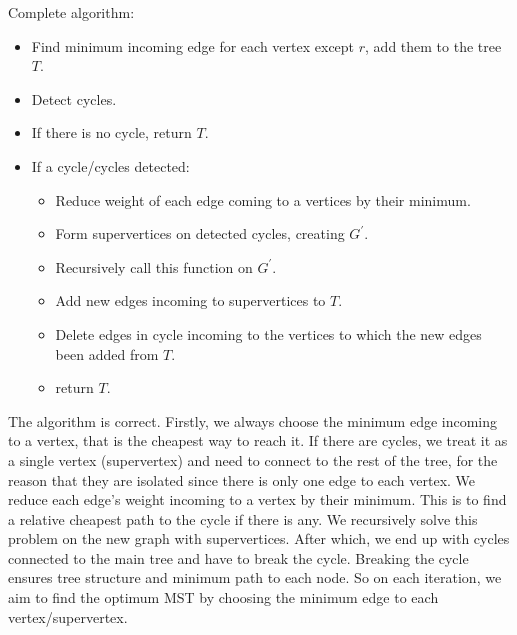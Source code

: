 \documentclass{article}
\begin{document}
\begin{enumerate}
\begin{enumerate}
\begin{enumerate}
        Complete algorithm:
        \begin{itemize}
          \item Find minimum incoming edge for each vertex except $r$, add them to the tree $T$.
          \item Detect cycles.
          \item If there is no cycle, return $T$.
          \item If a cycle/cycles detected:
            \begin{itemize}
              \item Reduce weight of each edge coming to a vertices by their minimum.
              \item Form supervertices on detected cycles, creating $G^\prime$.
              \item Recursively call this function on $G^\prime$.
              \item Add new edges incoming to supervertices to $T$.
              \item Delete edges in cycle incoming to the vertices to which the new edges been added from $T$.
              \item return $T$.
            \end{itemize}
        \end{itemize}

        The algorithm is correct.
        Firstly, we always choose the minimum edge incoming to a vertex, that is the cheapest way to reach it.
        If there are cycles, we treat it as a single vertex (supervertex) and need to connect to the rest of the tree, for the reason that they are isolated since there is only one edge to each vertex.
        We reduce each edge's weight incoming to a vertex by their minimum.
        This is to find a relative cheapest path to the cycle if there is any.
        We recursively solve this problem on the new graph with supervertices.
        After which, we end up with cycles connected to the main tree and have to break the cycle.
        Breaking the cycle ensures tree structure and minimum path to each node.
        So on each iteration, we aim to find the optimum MST by choosing the minimum edge to each vertex/supervertex.

      \end{enumerate}
    \end{enumerate}
\end{enumerate}
\end{document}
